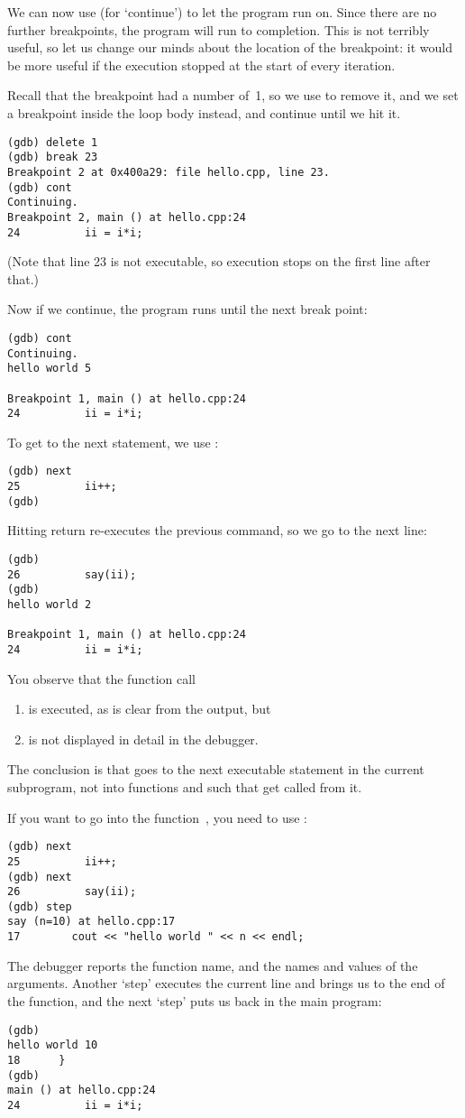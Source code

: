 We can now use  (for `continue') to let the program run on.
Since there are no further breakpoints, the program will run to completion.
This is not terribly useful, so let us change our minds about the location of the breakpoint:
it would be more useful if the execution stopped at the start of every iteration.

Recall that the breakpoint had a number of~1, so we use  to remove it,
and we set a breakpoint inside the loop body instead,
and continue until we hit it.
\begin{lstlisting}
(gdb) delete 1
(gdb) break 23
Breakpoint 2 at 0x400a29: file hello.cpp, line 23.
(gdb) cont
Continuing.
Breakpoint 2, main () at hello.cpp:24
24          ii = i*i;
\end{lstlisting}
(Note that line 23 is not executable, so execution stops on the first line after that.)

Now if we continue, the program runs until the next break point:
\begin{lstlisting}
(gdb) cont
Continuing.
hello world 5

Breakpoint 1, main () at hello.cpp:24
24          ii = i*i;
\end{lstlisting}

To get to the next statement, we use :
\begin{verbatim}
(gdb) next
25          ii++;
(gdb)
\end{verbatim}

Hitting return re-executes the previous command,
so we go to the next line:
\begin{verbatim}
(gdb)
26          say(ii);
(gdb)
hello world 2

Breakpoint 1, main () at hello.cpp:24
24          ii = i*i;
\end{verbatim}

You observe that the function call
\begin{enumerate}
\item is executed, as is clear from the  output, but
\item is not displayed in detail in the debugger.
\end{enumerate}
The conclusion is that  goes to the next executable statement
in the current subprogram, not into functions and such that get called from it.

If you want to go into the function~, you need to use :
\begin{verbatim}
(gdb) next
25          ii++;
(gdb) next
26          say(ii);
(gdb) step
say (n=10) at hello.cpp:17
17        cout << "hello world " << n << endl;
\end{verbatim}
The debugger reports the function name, and the names and values of the arguments.
Another `step' executes the current line and brings us to the end of the function,
and the next `step' puts us back in the main program:
\begin{verbatim}
(gdb)
hello world 10
18      }
(gdb)
main () at hello.cpp:24
24          ii = i*i;
\end{verbatim}

